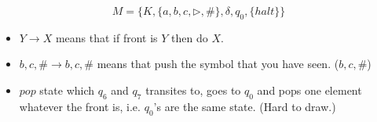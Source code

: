 \documentclass[12pt]{article}
\begin{document}
    $$M = \{K, \{a,b,c,\triangleright, \#\}, \delta, q_0, \{halt\}\}$$

    \begin{itemize}
      \item $Y\rightarrow X$ means that if front is $Y$ then do $X$.
      \item $b,c,\# \rightarrow b,c,\#$ means that push the symbol that you have seen. ($b,c,\#$)
      \item $pop$ state which $q_6$ and $q_7$ transites to, goes to $q_0$ and pops one element whatever the front is, i.e. $q_0$'s are the same state. (Hard to draw.)
    \end{itemize}
    \vspace*{2cm}

    \hspace{-1.5cm}
\end{document}

